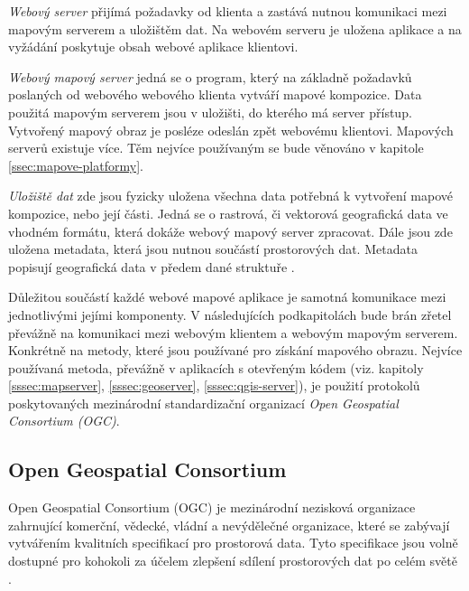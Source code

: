 \textit{Webový server} přijímá požadavky od klienta a zastává nutnou
komunikaci mezi mapovým serverem a uložištěm dat. Na webovém serveru
je uložena aplikace a na vyžádání poskytuje obsah webové aplikace
klientovi.

\textit{Webový mapový server} jedná se o program, který na základně
požadavků poslaných od webového webového klienta vytváří mapové kompozice. Data použitá mapovým serverem jsou v uložišti, do kterého má server přístup. Vytvořený mapový obraz je posléze odeslán zpět webovému klientovi. Mapových serverů existuje
více. Těm nejvíce používaným se bude věnováno v kapitole \ref{ssec:mapove-platformy}.

\textit{Uložiště dat} zde jsou fyzicky uložena všechna data potřebná k
vytvoření mapové kompozice, nebo její části. Jedná se o rastrová, či vektorová
geografická data ve vhodném formátu, která dokáže webový mapový server
zpracovat. Dále jsou zde uložena metadata, která jsou nutnou součástí
prostorových dat. Metadata popisují geografická data v předem dané struktuře \cite{web_mapping}.

Důležitou součástí každé webové mapové aplikace je samotná komunikace
mezi jednotlivými jejími komponenty. V následujících podkapitolách
bude brán zřetel převážně na komunikaci mezi webovým klientem a
webovým mapovým serverem. Konkrétně na metody, které jsou používané
pro získání mapového obrazu. Nejvíce používaná metoda, převážně v aplikacích s otevřeným kódem (viz. kapitoly \ref{sssec:mapserver}, \ref{sssec:geoserver}, \ref{sssec:qgis-server}), je použití protokolů poskytovaných mezinárodní standardizační organizací \textit{Open Geospatial Consortium (OGC)}.

\subsection{Open Geospatial Consortium}
\label{sssec:ogc}

Open Geospatial Consortium (OGC) je mezinárodní nezisková organizace
zahrnující komerční, vědecké, vládní a nevýdělečné organizace, které
se zabývají vytvářením kvalitních specifikací pro prostorová
data. Tyto specifikace jsou volně dostupné pro kohokoli za účelem
zlepšení sdílení prostorových dat po celém světě \cite{oqc_web}.

